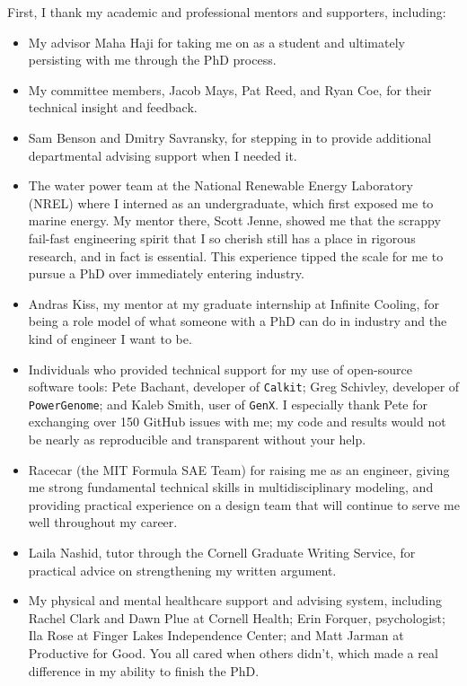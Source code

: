 First, I thank my academic and professional mentors and supporters, including:
\begin{itemize}
  \item My advisor Maha Haji for taking me on as a student and ultimately persisting with me through the PhD process.
  \item My committee members, Jacob Mays, Pat Reed, and Ryan Coe, for their technical insight and feedback.
  \item Sam Benson and Dmitry Savransky, for stepping in to provide additional departmental advising support when I needed it.
  \item The water power team at the National Renewable Energy Laboratory (NREL) where I interned as an undergraduate,
  which first exposed me to marine energy. My mentor there, Scott Jenne,
  showed me that the scrappy fail-fast engineering spirit that I so cherish still has a place in rigorous research,
  and in fact is essential.
  This experience tipped the scale for me to pursue a PhD over immediately entering industry.
  \item Andras Kiss, my mentor at my graduate internship at Infinite Cooling, 
  for being a role model of what someone with a PhD can do in industry and the kind of engineer I want to be.
  \item Individuals who provided technical support for my use of open-source software tools:
  Pete Bachant, developer of \texttt{Calkit}; Greg Schivley, developer of \texttt{PowerGenome};
  and Kaleb Smith, user of \texttt{GenX}.
  I especially thank Pete for exchanging over 150 GitHub issues with me;
  my code and results would not be nearly as reproducible and transparent without your help.
  \item Racecar (the MIT Formula SAE Team) for raising me as an engineer, giving me strong fundamental technical skills 
  in multidisciplinary modeling, and providing practical experience on a design team that will continue to serve me well throughout my career.
  \item Laila Nashid, tutor through the Cornell Graduate Writing Service, for practical advice on strengthening my written argument.
  \item My physical and mental healthcare support and advising system, 
  including Rachel Clark and Dawn Plue at Cornell Health; Erin Forquer, psychologist; Ila Rose at Finger Lakes Independence Center; and Matt Jarman at Productive for Good.
  You all cared when others didn't, which made a real difference in my ability to finish the PhD.
\end{itemize}

